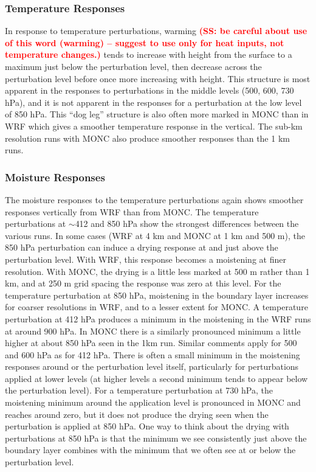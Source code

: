 \documentclass[draft]{agujournal2019}
\newcommand{\todo}[1]{\textcolor{red}{\textbf{(#1)}}}
\begin{document}
\subsubsection{Temperature Responses}

In response to temperature perturbations, warming \todo{SS: be careful about use of this word (warming) -- suggest to use only for heat inputs, not temperature changes.} tends to increase with height
from the surface to a maximum just below the perturbation level, then decrease
across the perturbation level before once more increasing with height. This
structure is most apparent in the responses to perturbations in the middle
levels (500, 600, 730 hPa), and it is not apparent in the responses for a
perturbation at the low level of 850 hPa. This ``dog leg'' structure is also
often more marked in MONC than in WRF which gives a smoother temperature
response in the vertical. The sub-km resolution runs with MONC also produce
smoother responses than the 1 km runs.

\subsubsection{Moisture Responses}

The moisture responses to the temperature perturbations again shows smoother
responses vertically from WRF than from MONC. The temperature perturbations at $\sim$412
and 850 hPa show the strongest
differences between the various runs. In some cases (WRF at 4 km and MONC at 1
km and 500 m), the 850 hPa perturbation can induce a drying response at and just
above the perturbation level. With WRF, this response becomes a moistening at
finer resolution. With MONC, the drying is a little less marked at 500 m rather
than 1 km, and at 250 m grid spacing the response was zero at this level. For
the temperature perturbation at 850 hPa, moistening in the boundary layer
increases for coarser resolutions in WRF, and to a lesser extent for MONC. A
temperature perturbation at 412 hPa produces a minimum in the moistening in the
WRF runs at around 900 hPa. In MONC there is a similarly pronounced minimum a
little higher at about 850 hPa seen in the 1km run. Similar comments apply for
500 and 600 hPa as for 412 hPa. There is often a small minimum in the moistening
responses around or the perturbation level itself, particularly for
perturbations applied at lower levels (at higher levels a second minimum tends
to appear below the perturbation level). For a temperature perturbation at 730
hPa, the moistening minimum around the application level is pronounced in MONC
and reaches around zero, but it does not produce the drying seen when the
perturbation is applied at 850 hPa. One way to think about the drying with
perturbations at 850 hPa is that the minimum we see consistently just above the
boundary layer combines with the minimum that we often see at or below the
perturbation level.
\end{document}
